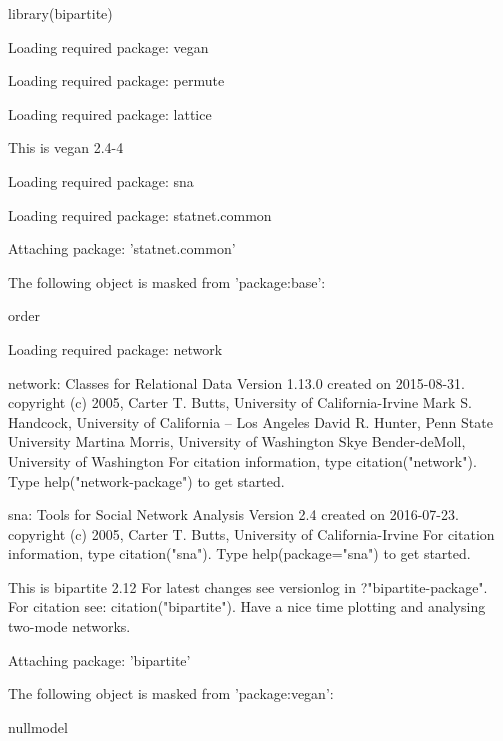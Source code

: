 \documentclass[a4paper, 11pt]{article}\usepackage[]{graphicx}\usepackage[]{color}
\begin{document}
\begin{Schunk}
\begin{Sinput}
library(bipartite)
\end{Sinput}
\begin{Soutput}
Loading required package: vegan
\end{Soutput}
\begin{Soutput}
Loading required package: permute
\end{Soutput}
\begin{Soutput}
Loading required package: lattice
\end{Soutput}
\begin{Soutput}
This is vegan 2.4-4
\end{Soutput}
\begin{Soutput}
Loading required package: sna
\end{Soutput}
\begin{Soutput}
Loading required package: statnet.common
\end{Soutput}
\begin{Soutput}

Attaching package: 'statnet.common'
\end{Soutput}
\begin{Soutput}
The following object is masked from 'package:base':

    order
\end{Soutput}
\begin{Soutput}
Loading required package: network
\end{Soutput}
\begin{Soutput}
network: Classes for Relational Data
Version 1.13.0 created on 2015-08-31.
copyright (c) 2005, Carter T. Butts, University of California-Irvine
                    Mark S. Handcock, University of California -- Los Angeles
                    David R. Hunter, Penn State University
                    Martina Morris, University of Washington
                    Skye Bender-deMoll, University of Washington
 For citation information, type citation("network").
 Type help("network-package") to get started.
\end{Soutput}
\begin{Soutput}
sna: Tools for Social Network Analysis
Version 2.4 created on 2016-07-23.
copyright (c) 2005, Carter T. Butts, University of California-Irvine
 For citation information, type citation("sna").
 Type help(package="sna") to get started.
\end{Soutput}
\begin{Soutput}
 This is bipartite 2.12
 For latest changes see versionlog in  ?"bipartite-package".
 For citation see: citation("bipartite").
 Have a nice time plotting and analysing two-mode networks.
\end{Soutput}
\begin{Soutput}

Attaching package: 'bipartite'
\end{Soutput}
\begin{Soutput}
The following object is masked from 'package:vegan':

    nullmodel
\end{Soutput}
\end{Schunk}
\end{document}
